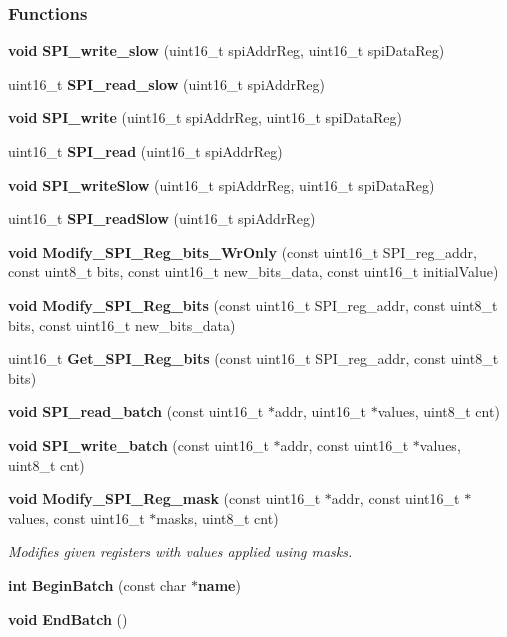 \subsubsection*{Functions}
\begin{DoxyCompactItemize}
\item 
{\bf void} {\bf S\+P\+I\+\_\+write\+\_\+slow} (uint16\+\_\+t spi\+Addr\+Reg, uint16\+\_\+t spi\+Data\+Reg)
\item 
uint16\+\_\+t {\bf S\+P\+I\+\_\+read\+\_\+slow} (uint16\+\_\+t spi\+Addr\+Reg)
\item 
{\bf void} {\bf S\+P\+I\+\_\+write} (uint16\+\_\+t spi\+Addr\+Reg, uint16\+\_\+t spi\+Data\+Reg)
\item 
uint16\+\_\+t {\bf S\+P\+I\+\_\+read} (uint16\+\_\+t spi\+Addr\+Reg)
\item 
{\bf void} {\bf S\+P\+I\+\_\+write\+Slow} (uint16\+\_\+t spi\+Addr\+Reg, uint16\+\_\+t spi\+Data\+Reg)
\item 
uint16\+\_\+t {\bf S\+P\+I\+\_\+read\+Slow} (uint16\+\_\+t spi\+Addr\+Reg)
\item 
{\bf void} {\bf Modify\+\_\+\+S\+P\+I\+\_\+\+Reg\+\_\+bits\+\_\+\+Wr\+Only} (const uint16\+\_\+t S\+P\+I\+\_\+reg\+\_\+addr, const uint8\+\_\+t bits, const uint16\+\_\+t new\+\_\+bits\+\_\+data, const uint16\+\_\+t initial\+Value)
\item 
{\bf void} {\bf Modify\+\_\+\+S\+P\+I\+\_\+\+Reg\+\_\+bits} (const uint16\+\_\+t S\+P\+I\+\_\+reg\+\_\+addr, const uint8\+\_\+t bits, const uint16\+\_\+t new\+\_\+bits\+\_\+data)
\item 
uint16\+\_\+t {\bf Get\+\_\+\+S\+P\+I\+\_\+\+Reg\+\_\+bits} (const uint16\+\_\+t S\+P\+I\+\_\+reg\+\_\+addr, const uint8\+\_\+t bits)
\item 
{\bf void} {\bf S\+P\+I\+\_\+read\+\_\+batch} (const uint16\+\_\+t $\ast$addr, uint16\+\_\+t $\ast$values, uint8\+\_\+t cnt)
\item 
{\bf void} {\bf S\+P\+I\+\_\+write\+\_\+batch} (const uint16\+\_\+t $\ast$addr, const uint16\+\_\+t $\ast$values, uint8\+\_\+t cnt)
\item 
{\bf void} {\bf Modify\+\_\+\+S\+P\+I\+\_\+\+Reg\+\_\+mask} (const uint16\+\_\+t $\ast$addr, const uint16\+\_\+t $\ast$values, const uint16\+\_\+t $\ast$masks, uint8\+\_\+t cnt)
\begin{DoxyCompactList}\small\item\em Modifies given registers with values applied using masks. \end{DoxyCompactList}\item 
{\bf int} {\bf Begin\+Batch} (const char $\ast${\bf name})
\item 
{\bf void} {\bf End\+Batch} ()
\end{DoxyCompactItemize}


